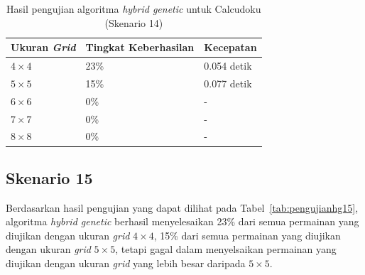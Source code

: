 \begin{table}
\centering
\captionsetup{justification=centering}
\caption[Hasil pengujian algoritma \textit{hybrid genetic} untuk Calcudoku (Skenario 14)]{Hasil pengujian algoritma \textit{hybrid genetic} untuk Calcudoku (Skenario 14)}
\begin{tabular}{| l | l | l |}
\hline
Ukuran \textit{Grid} & Tingkat Keberhasilan & Kecepatan \\
\hline \hline
\begin{math}4 \times 4\end{math} & 23\% & 0.054 detik \\
\hline
\begin{math}5 \times 5\end{math} & 15\% & 0.077 detik \\
\hline
\begin{math}6 \times 6\end{math} & 0\% & - \\
\hline
\begin{math}7 \times 7\end{math} & 0\% & - \\
\hline
\begin{math}8 \times 8\end{math} & 0\% & - \\
\hline
\end{tabular}
\label{tab:pengujianhg14}
\end{table}

\subsection{Skenario 15}
\label{sec:skenario15}

Berdasarkan hasil pengujian yang dapat dilihat pada Tabel~\ref{tab:pengujianhg15}, algoritma \textit{hybrid genetic} berhasil menyelesaikan 23\% dari semua permainan yang diujikan dengan ukuran \textit{grid} \begin{math}4 \times 4\end{math}, 15\% dari semua permainan yang diujikan dengan ukuran \textit{grid} \begin{math}5 \times 5\end{math}, tetapi gagal dalam menyelsaikan permainan yang diujikan dengan ukuran \textit{grid} yang lebih besar daripada \begin{math}5 \times 5\end{math}.

